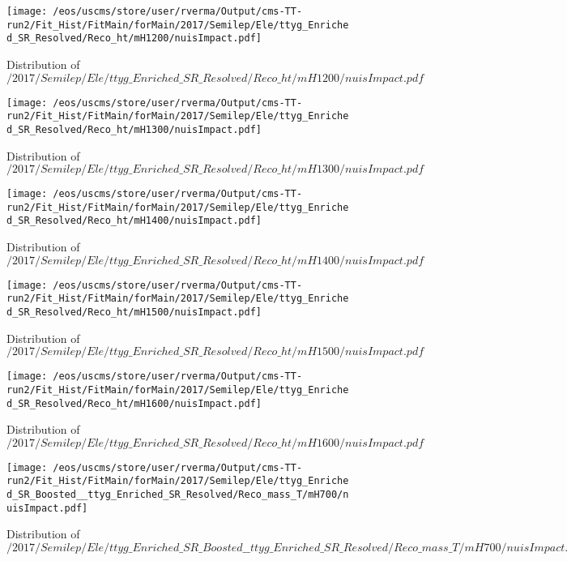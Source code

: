 \begin{figure}
\centering
\texttt{[image: /eos/uscms/store/user/rverma/Output/cms-TT-run2/Fit\_Hist/FitMain/forMain/2017/Semilep/Ele/ttyg\_Enriched\_SR\_Resolved/Reco\_ht/mH1200/nuisImpact.pdf]}
\caption{Distribution of $/2017/Semilep/Ele/ttyg\_Enriched\_SR\_Resolved/Reco\_ht/mH1200/nuisImpact.pdf$}
\end{figure}

\begin{figure}
\centering
\texttt{[image: /eos/uscms/store/user/rverma/Output/cms-TT-run2/Fit\_Hist/FitMain/forMain/2017/Semilep/Ele/ttyg\_Enriched\_SR\_Resolved/Reco\_ht/mH1300/nuisImpact.pdf]}
\caption{Distribution of $/2017/Semilep/Ele/ttyg\_Enriched\_SR\_Resolved/Reco\_ht/mH1300/nuisImpact.pdf$}
\end{figure}

\begin{figure}
\centering
\texttt{[image: /eos/uscms/store/user/rverma/Output/cms-TT-run2/Fit\_Hist/FitMain/forMain/2017/Semilep/Ele/ttyg\_Enriched\_SR\_Resolved/Reco\_ht/mH1400/nuisImpact.pdf]}
\caption{Distribution of $/2017/Semilep/Ele/ttyg\_Enriched\_SR\_Resolved/Reco\_ht/mH1400/nuisImpact.pdf$}
\end{figure}

\begin{figure}
\centering
\texttt{[image: /eos/uscms/store/user/rverma/Output/cms-TT-run2/Fit\_Hist/FitMain/forMain/2017/Semilep/Ele/ttyg\_Enriched\_SR\_Resolved/Reco\_ht/mH1500/nuisImpact.pdf]}
\caption{Distribution of $/2017/Semilep/Ele/ttyg\_Enriched\_SR\_Resolved/Reco\_ht/mH1500/nuisImpact.pdf$}
\end{figure}

\begin{figure}
\centering
\texttt{[image: /eos/uscms/store/user/rverma/Output/cms-TT-run2/Fit\_Hist/FitMain/forMain/2017/Semilep/Ele/ttyg\_Enriched\_SR\_Resolved/Reco\_ht/mH1600/nuisImpact.pdf]}
\caption{Distribution of $/2017/Semilep/Ele/ttyg\_Enriched\_SR\_Resolved/Reco\_ht/mH1600/nuisImpact.pdf$}
\end{figure}

\begin{figure}
\centering
\texttt{[image: /eos/uscms/store/user/rverma/Output/cms-TT-run2/Fit\_Hist/FitMain/forMain/2017/Semilep/Ele/ttyg\_Enriched\_SR\_Boosted\_\_ttyg\_Enriched\_SR\_Resolved/Reco\_mass\_T/mH700/nuisImpact.pdf]}
\caption{Distribution of $/2017/Semilep/Ele/ttyg\_Enriched\_SR\_Boosted\_\_ttyg\_Enriched\_SR\_Resolved/Reco\_mass\_T/mH700/nuisImpact.pdf$}
\end{figure}


